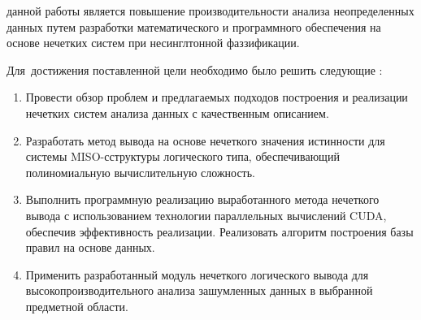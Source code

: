 \ifsynopsis
\else
\fi


{\aim} данной работы является повышение производительности анализа неопределенных данных путем разработки математического и программного обеспечения на основе нечетких систем при несинглтонной фаззификации.

Для~достижения поставленной цели необходимо было решить следующие {\tasks}:
\begin{enumerate}[beginpenalty=10000] %
  \item Провести обзор проблем и предлагаемых подходов построения и реализации нечетких систем анализа данных с качественным описанием.
  \item Разработать метод вывода на основе нечеткого значения истинности для системы MISO-сструктуры логического типа, обеспечивающий полиномиальную вычислительную сложность.
  \item Выполнить программную реализацию выработанного метода нечеткого вывода с использованием технологии параллельных вычислений CUDA, обеспечив эффективность реализации. Реализовать алгоритм построения базы правил на основе данных.
  \item Применить разработанный модуль нечеткого логического вывода для высокопроизводительного анализа зашумленных данных в выбранной предметной области.
\end{enumerate}



